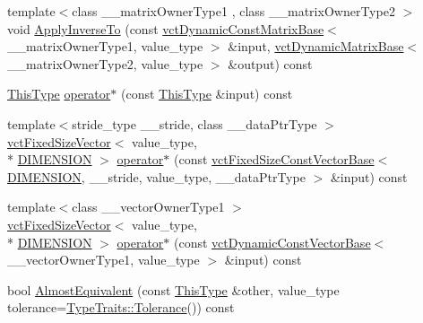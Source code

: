 \begin{DoxyCompactItemize}
\item 
{\footnotesize template$<$class \-\_\-\-\_\-matrix\-Owner\-Type1 , class \-\_\-\-\_\-matrix\-Owner\-Type2 $>$ }\\void \hyperlink{classvct_matrix_rotation3_const_base_a9bf0d05680ea22c07d7906813f515c39}{Apply\-Inverse\-To} (const \hyperlink{classvct_dynamic_const_matrix_base}{vct\-Dynamic\-Const\-Matrix\-Base}$<$ \-\_\-\-\_\-matrix\-Owner\-Type1, value\-\_\-type $>$ \&input, \hyperlink{classvct_dynamic_matrix_base}{vct\-Dynamic\-Matrix\-Base}$<$ \-\_\-\-\_\-matrix\-Owner\-Type2, value\-\_\-type $>$ \&output) const 
\item 
\hyperlink{classvct_matrix_rotation3_const_base_ad26bf016ce37ea0532e1ce0aa7bba8a0}{This\-Type} \hyperlink{classvct_matrix_rotation3_const_base_a9c381ea7eb0be99b27c142afbbbd559d}{operator$\ast$} (const \hyperlink{classvct_matrix_rotation3_const_base_ad26bf016ce37ea0532e1ce0aa7bba8a0}{This\-Type} \&input) const 
\item 
{\footnotesize template$<$stride\-\_\-type \-\_\-\-\_\-stride, class \-\_\-\-\_\-data\-Ptr\-Type $>$ }\\\hyperlink{classvct_fixed_size_vector}{vct\-Fixed\-Size\-Vector}$<$ value\-\_\-type, \\*
\hyperlink{classvct_matrix_rotation3_const_base_a6bc9712dde55ee3fca0d7880feb6a903afdf02f4ad230d81f0ca2539c7feb61f3}{D\-I\-M\-E\-N\-S\-I\-O\-N} $>$ \hyperlink{classvct_matrix_rotation3_const_base_a185793b48e2be35f46bd0855cbec8b03}{operator$\ast$} (const \hyperlink{classvct_fixed_size_const_vector_base}{vct\-Fixed\-Size\-Const\-Vector\-Base}$<$ \hyperlink{classvct_matrix_rotation3_const_base_a6bc9712dde55ee3fca0d7880feb6a903afdf02f4ad230d81f0ca2539c7feb61f3}{D\-I\-M\-E\-N\-S\-I\-O\-N}, \-\_\-\-\_\-stride, value\-\_\-type, \-\_\-\-\_\-data\-Ptr\-Type $>$ \&input) const 
\item 
{\footnotesize template$<$class \-\_\-\-\_\-vector\-Owner\-Type1 $>$ }\\\hyperlink{classvct_fixed_size_vector}{vct\-Fixed\-Size\-Vector}$<$ value\-\_\-type, \\*
\hyperlink{classvct_matrix_rotation3_const_base_a6bc9712dde55ee3fca0d7880feb6a903afdf02f4ad230d81f0ca2539c7feb61f3}{D\-I\-M\-E\-N\-S\-I\-O\-N} $>$ \hyperlink{classvct_matrix_rotation3_const_base_a8ee7706c66f346505d81e3cdd0f8eaca}{operator$\ast$} (const \hyperlink{classvct_dynamic_const_vector_base}{vct\-Dynamic\-Const\-Vector\-Base}$<$ \-\_\-\-\_\-vector\-Owner\-Type1, value\-\_\-type $>$ \&input) const 
\item 
bool \hyperlink{classvct_matrix_rotation3_const_base_ad321ab64b8b9b8aa51230fedb0ab2ea3}{Almost\-Equivalent} (const \hyperlink{classvct_matrix_rotation3_const_base_ad26bf016ce37ea0532e1ce0aa7bba8a0}{This\-Type} \&other, value\-\_\-type tolerance=\hyperlink{classcmn_type_traits_adc129bf9867295b90d300768b780fa99}{Type\-Traits\-::\-Tolerance}()) const 
\end{DoxyCompactItemize}
